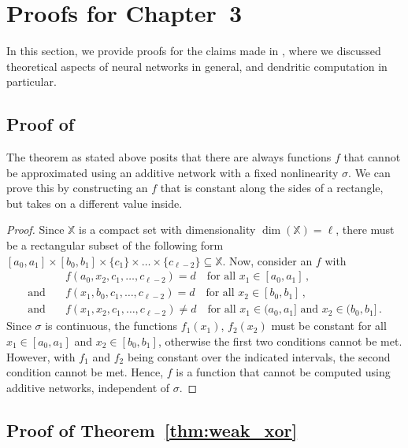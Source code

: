 
\section{Proofs for Chapter~3}
\label{app:neural_network_proofs}

In this section, we provide proofs for the claims made in , where we discussed theoretical aspects of neural networks in general, and dendritic computation in particular.

\subsection{Proof of }

The theorem as stated above posits that there are always functions $f$ that cannot be approximated using an additive network with a fixed nonlinearity $\sigma$.
We can prove this by constructing an $f$ that is constant along the sides of a rectangle, but takes on a different value inside.

\ThmXorGeneral*

\begin{proof}
Since $\mathbb{X}$ is a compact set with dimensionality $\dim(\mathbb{X}) = \ell$, there must be a rectangular subset of the following form
$[a_0, a_1] \times [b_0, b_1] \times \{c_1\} \times \ldots \times \{c_{\ell - 2}\} \subseteq \mathbb{X}$.
Now, consider an $f$ with
\begin{align*}
				     &f(a_0, x_2, c_1, \ldots, c_{\ell - 2}) = d \quad \text{for all } x_1 \in [a_0, a_1] \,, \\
	\text{and} \quad &f(x_1, b_0, c_1, \ldots, c_{\ell - 2}) = d \quad \text{for all } x_2 \in [b_0, b_1] \,, \\
	\text{and} \quad &f(x_1, x_2, c_1, \ldots, c_{\ell - 2}) \neq d \quad \text{for all } x_1 \in (a_0, a_1] \text{ and } x_2 \in (b_0, b_1] \,.
\end{align*}
Since $\sigma$ is continuous, the functions $f_1(x_1)$, $f_2(x_2)$ must be constant for all $x_1 \in [a_0, a_1]$ and $x_2 \in [b_0, b_1]$, otherwise the first two conditions cannot be met.
However, with $f_1$ and $f_2$ being constant over the indicated intervals, the second condition cannot be met. Hence, $f$ is a function that cannot be computed using additive networks, independent of $\sigma$.
\end{proof}

\subsection{Proof of Theorem~\ref{thm:weak_xor}}
\label{app:thm_weak_xor}

